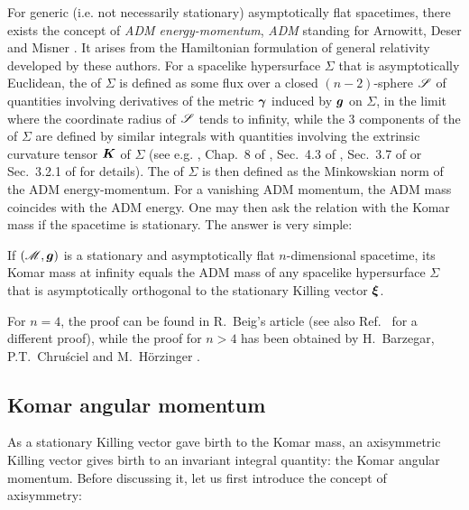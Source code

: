 For generic (i.e. not necessarily stationary) asymptotically flat spacetimes,
there exists the concept of \emph{ADM energy-momentum}, \emph{ADM} standing for
Arnowitt, Deser and Misner \cite{ArnowDM62}. It arises from the Hamiltonian
formulation of general relativity developed by these authors.
For a spacelike hypersurface $\Sigma$ that is asymptotically Euclidean,
the  of $\Sigma$ is defined
as some flux over a closed $(n-2)$-sphere $\mathscr{S}$ of quantities involving derivatives
of the metric $\bm{\gamma}$ induced by $\bm{g}$ on $\Sigma$, in the limit where
the coordinate radius of $\mathscr{S}$ tends to infinity, while the
3 components of the 
of $\Sigma$ are defined by similar integrals with quantities involving the extrinsic curvature
tensor $\bm{K}$ of $\Sigma$ (see e.g. \cite{JaramG11},
Chap.~8 of \cite{Gourg12}, Sec.~4.3 of \cite{Poiss04},
Sec.~3.7 of \cite{Strau13} or Sec.~3.2.1 of \cite{Szaba09} for details).
The  of $\Sigma$
is then defined as the Minkowskian norm of the ADM energy-momentum.
For a vanishing ADM momentum, the ADM mass coincides with the ADM energy.
One may then ask the relation with the Komar mass if the spacetime is stationary.
The answer is very simple:
\begin{prop}
\label{p:sta:Komar_ADM_mass}
If $(\mathscr{M},\bm{g})$ is a stationary and asymptotically flat $n$-dimensional spacetime,
its Komar mass at infinity equals the ADM mass of any spacelike hypersurface
$\Sigma$ that is asymptotically orthogonal to the stationary Killing vector $\bm{\xi}$.
\end{prop}
For $n=4$, the proof can be found in R.~Beig's article \cite{Beig78}
(see also Ref.~\cite{AshteM79} for a different proof), while the proof
for $n>4$ has been obtained by H.~Barzegar, P.T.~Chruściel and M.~Hörzinger \cite{BarzgCH17}.

\subsection{Komar angular momentum} \label{s:sta:Komar_angu_mom}

As a stationary Killing vector gave birth to the Komar mass,
an axisymmetric Killing vector gives birth to an invariant integral quantity:
the Komar angular momentum. Before discussing it, let us first introduce
the concept of axisymmetry:

